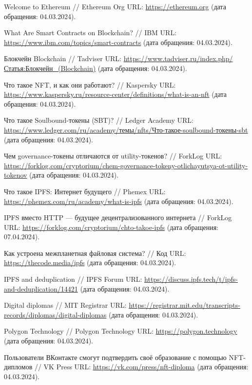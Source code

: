 \begin{thebibliography}{99\kern\bibindent}
	 Welcome to Ethereum // Ethereum Org URL: \url{https://ethereum.org} (дата обращения: 04.03.2024).

	 What Are Smart Contracts on Blockchain? // IBM URL: \url{https://www.ibm.com/topics/smart-contracts} (дата обращения: 04.03.2024).

	 Блокчейн
	Blockchain // Tadviser URL: \url{https://www.tadviser.ru/index.php/Статья:Блокчейн_(Blockchain)} (дата обращения: 04.03.2024).

	 Что такое NFT, и как они работают? // Kaspersky URL: \url{https://www.kaspersky.ru/resource-center/definitions/what-is-an-nft} (дата обращения: 04.03.2024).

	 Что такое Soulbound-токены (SBT)? // Ledger Academy URL: \url{https://www.ledger.com/ru/academy/темы/nfts/Что-такое-soulbound-токены-sbt} (дата обращения: 04.03.2024).

	 Чем governance-токены отличаются от utility-токенов? // ForkLog URL: \url{https://forklog.com/cryptorium/chem-governance-tokeny-otlichayutsya-ot-utility-tokenov} (дата обращения: 04.03.2024).

	 Что такое IPFS: Интернет будущего // Phemex URL: \url{https://phemex.com/ru/academy/what-is-ipfs} (дата обращения: 04.03.2024).

	 IPFS вместо HTTP — будущее децентрализованного интернета // ForkLog URL: \url{https://forklog.com/cryptorium/chto-takoe-ipfs} (дата обращения: 07.04.2024).

	 Как устроена межпланетная файловая система? // Код URL: \url{https://thecode.media/ipfs} (дата обращения: 04.03.2024).

	 IPFS and deduplication // IPFS Forum URL: \url{https://discuss.ipfs.tech/t/ipfs-and-deduplication/14421} (дата обращения: 04.03.2024).

	 Digital diplomas // MIT Registrar URL: \url{https://registrar.mit.edu/transcripts-records/diplomas/digital-diplomas} (дата обращения: 04.03.2024).

	 Polygon Technology // Polygon Technology URL: \url{https://polygon.technology} (дата обращения: 04.03.2024).
	
	 Пользователи ВКонтакте смогут подтвердить своё образование с помощью NFT-дипломов // VK Press URL: \url{https://vk.com/press/nft-diploma} (дата обращения: 04.03.2024).


\end{thebibliography}
